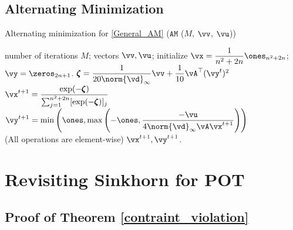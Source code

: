\subsection{Alternating Minimization}
\begin{algorithm}
    \caption{Alternating minimization for \eqref{General_AM}  ($\mathtt{AM}$ ($M$, $\vv$, $\vu$))}
    \label{alg:alternating_minimization}
    \begin{algorithmic}[1]
    \REQUIRE number of iterations \(M\); vectors $\vv, \vu$; initialize $\vx = \dfrac{1}{n^2+2n} \ones_{n^2+2n}$; $\vy= \zeros_{2n+1}$.
        \STATE \(\pmb{\zeta} = \dfrac{1}{20 \norm{\vd}_\infty} \vv + \dfrac{1}{10} \vA^\top (\vy^{t})^2\)
        \STATE \(
        \vx^{t+1} = \dfrac{\exp(-\pmb{\zeta})}{\sum_{j=1}^{n^2+2n}[\exp(-\pmb{\zeta})]_j}\)
        \STATE \( \vy^{t+1} = \min \left( \ones, \max \left(-\ones, \dfrac{-\vu}{4 \norm{\vd}_\infty \vA \vx^{t+1}} \right) \right)\) \\
        (All operations are element-wise) 
    \ENDFOR
    \ENSURE \( \vx^{t+1}, \vy^{t+1} \).
    \end{algorithmic}
\end{algorithm}



\section{Revisiting Sinkhorn for POT}
\subsection{Proof of Theorem \ref{contraint_violation}}

